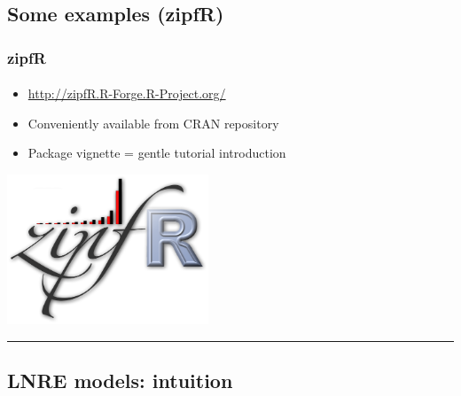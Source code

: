 \documentclass[handout,notes=show,t]{beamer} %
\begin{document}
\subsection{Some examples (zipfR)}

\begin{frame}
  \frametitle{zipfR}
  \framesubtitle{\citet{Evert:Baroni:07}}

  \begin{itemize}
  \item \url{http://zipfR.R-Forge.R-Project.org/}
  \item Conveniently available from CRAN repository
  \item Package vignette = gentle tutorial introduction
  \end{itemize}

  \begin{flushright}
    \includegraphics[width=6cm]{img/zipfR_logo}
    \rule{1cm}{0mm}
  \end{flushright}

\end{frame}

\begin{frame}[c]
  \begin{center}
  \end{center}
\end{frame}


\subsection{LNRE models: intuition}
\end{document}
